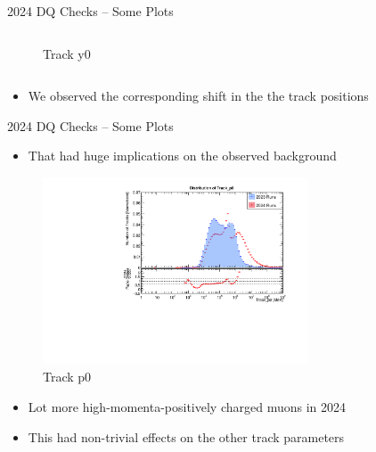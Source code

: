 \begin{frame}{2024 DQ Checks -- Some Plots}
\begin{columns}
\begin{column}{0.5 \textwidth}
\begin{figure}
                \caption{Track y0}
            \end{figure}
        \end{column}
    \end{columns}
    \begin{itemize}
        \item We observed the corresponding shift in the the track positions
    \end{itemize}
\end{frame}

\begin{frame}{2024 DQ Checks -- Some Plots}
    \begin{itemize}
        \item That had huge implications on the observed background
    \end{itemize}

        \begin{figure}
            \centering
            \includegraphics[width=0.7\textwidth]{assets/Track_p0.pdf}
            \caption{Track p0}
        \end{figure}
    \begin{itemize}
        \item Lot more high-momenta-positively charged muons in 2024
        \item This had non-trivial effects on the other track parameters
    \end{itemize}
\end{frame}


